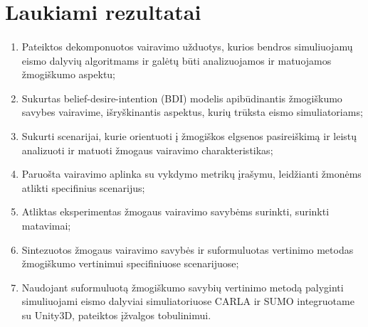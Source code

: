 \documentclass{beamer}
\begin{document}
\section{Laukiami rezultatai}
\begingroup
\small%
\begin{frame}{\insertsection}
\framesubtitle{\insertsubsection}
\vspace{-30.5pt}
\begin{enumerate}
	\item Pateiktos dekomponuotos vairavimo užduotys, kurios bendros simuliuojamų eismo dalyvių algoritmams ir galėtų būti analizuojamos ir matuojamos žmogiškumo aspektu;
	\item Sukurtas belief-desire-intention (BDI) modelis apibūdinantis žmogiškumo savybes vairavime, išryškinantis aspektus, kurių trūksta eismo simuliatoriams;
	\item Sukurti scenarijai, kurie orientuoti į žmogiškos elgsenos pasireiškimą ir leistų analizuoti ir matuoti žmogaus vairavimo charakteristikas;
	\item Paruošta vairavimo aplinka su vykdymo metrikų įrašymu, leidžianti žmonėms atlikti specifinius scenarijus;
	\item Atliktas eksperimentas žmogaus vairavimo savybėms surinkti, surinkti matavimai;
	\item Sintezuotos žmogaus vairavimo savybės ir suformuluotas vertinimo metodas žmogiškumo vertinimui specifiniuose scenarijuose;
	\item Naudojant suformuluotą žmogiškumo savybių vertinimo metodą palyginti simuliuojami eismo dalyviai simuliatoriuose CARLA ir SUMO integruotame su Unity3D, pateiktos įžvalgos tobulinimui.
\end{enumerate}
\end{frame}
\endgroup


%
\end{document}
